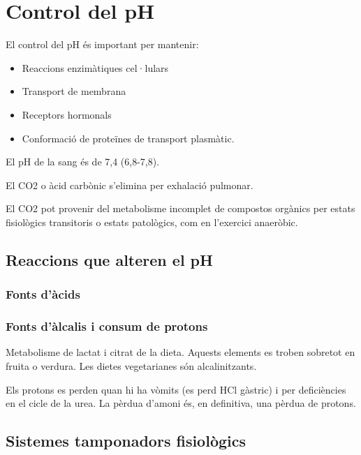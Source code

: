
\section{Control del pH}
\label{sec:control-del-ph}

El control del pH és important per mantenir:
\begin{itemize}
\item Reaccions enzimàtiques cel·lulars
\item Transport de membrana
\item Receptors hormonals
\item Conformació de proteïnes de transport plasmàtic.
\end{itemize}

El pH de la sang és de 7,4 (6,8-7,8).

El CO2 o àcid carbònic s'elimina per exhalació pulmonar.

El CO2 pot provenir del metabolisme incomplet de compostos orgànics
per estats fisiològics transitoris o estats patològics, com en
l'exercici anaeròbic.

\subsection{Reaccions que alteren el pH}
\label{sec:reacc-que-alter}

\subsubsection{Fonts d'àcids}
\label{sec:fonts-dacids}


\subsubsection{Fonts d'àlcalis i consum de protons}
\label{sec:fonts-dalcalis}
Metabolisme de lactat i citrat de la dieta. Aquests elements es troben
sobretot en fruita o verdura. Les dietes vegetarianes són
alcalinitzants.

Els protons es perden quan hi ha vòmits (es perd HCl gàstric) i per
deficiències en el cicle de la urea. La pèrdua d'amoni és, en
definitiva, una pèrdua de protons.

\subsection{Sistemes tamponadors fisiològics}
\label{sec:sist-tamp-fisi}

